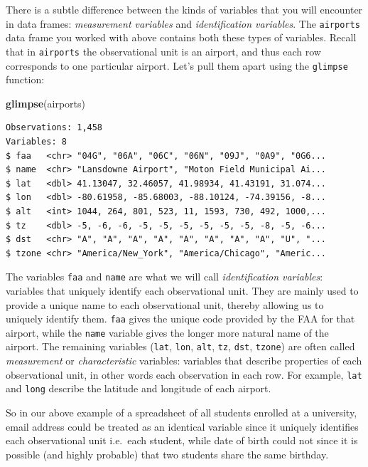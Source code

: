 \documentclass[12pt,]{krantz}
\makeatletter
\newenvironment{Shaded}{\begin{snugshade}}{\end{snugshade}}
\newcommand{\KeywordTok}[1]{\textcolor[rgb]{0.27,0.27,0.27}{\textbf{#1}}}
\newcommand{\NormalTok}[1]{#1}
\newenvironment{kframe}{%
\medskip{}
\setlength{\fboxsep}{.8em}
 \def\at@end@of@kframe{}%
 \ifinner\ifhmode%
  \def\at@end@of@kframe{\end{minipage}}%
  \begin{minipage}{\columnwidth}%
 \fi\fi%
 \def\FrameCommand##1{\hskip\@totalleftmargin \hskip-\fboxsep
 \colorbox{shadecolor}{##1}\hskip-\fboxsep
     \hskip-\linewidth \hskip-\@totalleftmargin \hskip\columnwidth}%
 \MakeFramed {\advance\hsize-\width
   \@totalleftmargin\z@ \linewidth\hsize
   \@setminipage}}%
 {\par\unskip\endMakeFramed%
 \at@end@of@kframe}
\renewenvironment{Shaded}{\begin{kframe}}{\end{kframe}}
\makeatother
\begin{document}
There is a subtle difference between the kinds of variables that you
will encounter in data frames: \emph{measurement variables} and
\emph{identification variables}. The \texttt{airports} data frame you
worked with above contains both these types of variables. Recall that in
\texttt{airports} the observational unit is an airport, and thus each
row corresponds to one particular airport. Let's pull them apart using
the \texttt{glimpse} function:

\begin{Shaded}
\begin{Highlighting}[]
\KeywordTok{glimpse}\NormalTok{(airports)}
\end{Highlighting}
\end{Shaded}

\begin{verbatim}
Observations: 1,458
Variables: 8
$ faa   <chr> "04G", "06A", "06C", "06N", "09J", "0A9", "0G6...
$ name  <chr> "Lansdowne Airport", "Moton Field Municipal Ai...
$ lat   <dbl> 41.13047, 32.46057, 41.98934, 41.43191, 31.074...
$ lon   <dbl> -80.61958, -85.68003, -88.10124, -74.39156, -8...
$ alt   <int> 1044, 264, 801, 523, 11, 1593, 730, 492, 1000,...
$ tz    <dbl> -5, -6, -6, -5, -5, -5, -5, -5, -5, -8, -5, -6...
$ dst   <chr> "A", "A", "A", "A", "A", "A", "A", "A", "U", "...
$ tzone <chr> "America/New_York", "America/Chicago", "Americ...
\end{verbatim}

The variables \texttt{faa} and \texttt{name} are what we will call
\emph{identification variables}: variables that uniquely identify each
observational unit. They are mainly used to provide a unique name to
each observational unit, thereby allowing us to uniquely identify them.
\texttt{faa} gives the unique code provided by the FAA for that airport,
while the \texttt{name} variable gives the longer more natural name of
the airport. The remaining variables (\texttt{lat}, \texttt{lon},
\texttt{alt}, \texttt{tz}, \texttt{dst}, \texttt{tzone}) are often
called \emph{measurement} or \emph{characteristic} variables: variables
that describe properties of each observational unit, in other words each
observation in each row. For example, \texttt{lat} and \texttt{long}
describe the latitude and longitude of each airport.

So in our above example of a spreadsheet of all students enrolled at a
university, email address could be treated as an identical variable
since it uniquely identifies each observational unit i.e.~each student,
while date of birth could not since it is possible (and highly probable)
that two students share the same birthday.
\end{document}
